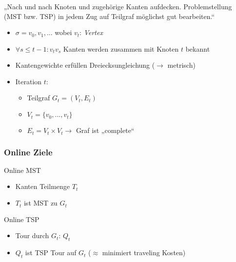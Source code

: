 \begin{frame}
    \frametitle{\insertsubsection}
    „Nach und nach Knoten und zugehörige Kanten aufdecken. Problemstellung (MST bzw. TSP) in jedem Zug auf Teilgraf möglichst gut bearbeiten.“
    \vspace{1em}
    \begin{itemize}
        \itemsep\setlength{.8em}
        \item $\sigma = v_0, v_1, ...$ wobei $v_t$: \emph{Vertex}
        \item $\forall s \leq t-1: v_tv_s$ Kanten werden zusammen mit Knoten $t$ bekannt
        \item Kantengewichte erfüllen Dreiecksungleichung ($\rightarrow$ metrisch)
        \item Iteration $t$:
        \vspace{.4em}
        \begin{itemize}
            \itemsep\setlength{.4em}
            \item Teilgraf $G_t = (V_t, E_t)$ 
            \item $V_t = \{v_0,...,v_t\}$
            \item $E_t = V_t \times V_t \rightarrow$ Graf ist „complete“
        \end{itemize}
    \end{itemize}
\end{frame}

\begin{frame}
    \frametitle{Online Ziele}
    \begin{block}{Online MST}
        \vspace{1em}
        \begin{itemize}
            \itemsep\setlength{.8em}
            \item Kanten Teilmenge $T_t$
            \item $T_t$ ist MST zu $G_t$
        \end{itemize}
        \vspace{.5em}
    \end{block}
    \vspace{1em}
    \begin{block}{Online TSP}
        \vspace{1em}
        \begin{itemize}
            \itemsep\setlength{.8em}
            \item Tour durch $G_t$: $Q_t$
            \item $Q_t$ ist TSP Tour auf $G_t$ ($\approx$ minimiert traveling Kosten)
        \end{itemize}
        \vspace{.5em}
    \end{block}
\end{frame}

